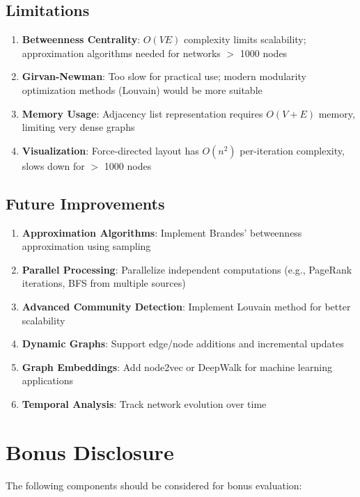 \documentclass[12pt,a4paper]{article}
\begin{document}
\subsection{Limitations}

\begin{enumerate}
    \item \textbf{Betweenness Centrality}: $O(VE)$ complexity limits scalability; approximation algorithms needed for networks $>$ 1000 nodes
    \item \textbf{Girvan-Newman}: Too slow for practical use; modern modularity optimization methods (Louvain) would be more suitable
    \item \textbf{Memory Usage}: Adjacency list representation requires $O(V + E)$ memory, limiting very dense graphs
    \item \textbf{Visualization}: Force-directed layout has $O(n^2)$ per-iteration complexity, slows down for $>$ 1000 nodes
\end{enumerate}

\subsection{Future Improvements}

\begin{enumerate}
    \item \textbf{Approximation Algorithms}: Implement Brandes' betweenness approximation using sampling
    \item \textbf{Parallel Processing}: Parallelize independent computations (e.g., PageRank iterations, BFS from multiple sources)
    \item \textbf{Advanced Community Detection}: Implement Louvain method for better scalability
    \item \textbf{Dynamic Graphs}: Support edge/node additions and incremental updates
    \item \textbf{Graph Embeddings}: Add node2vec or DeepWalk for machine learning applications
    \item \textbf{Temporal Analysis}: Track network evolution over time
\end{enumerate}

\section{Bonus Disclosure}

The following components should be considered for bonus evaluation:
\end{document}
